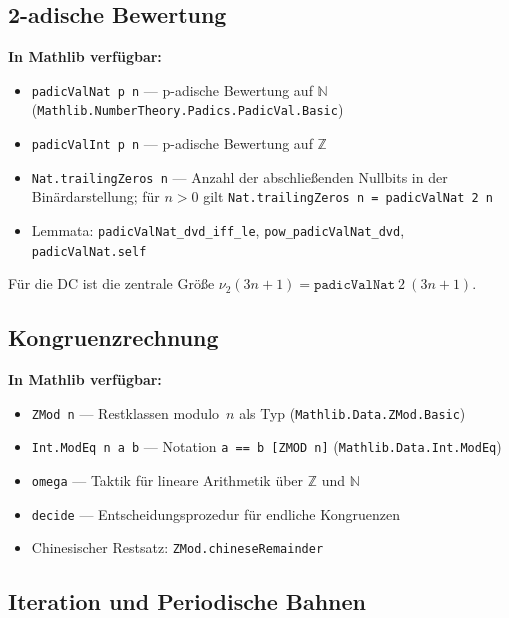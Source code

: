 \documentclass[12pt,a4paper]{article}
\newcommand{\vii}{\nu_2}
\newcommand{\N}{\mathbb{N}}
\newcommand{\Z}{\mathbb{Z}}
\begin{document}
\subsection{2-adische Bewertung}

\begin{tcolorbox}[ergebnis]
\textbf{In Mathlib verfügbar:}
\begin{itemize}
  \item \lstinline|padicValNat p n| --- p-adische Bewertung auf $\N$
    (\texttt{Mathlib.NumberTheory.Padics.PadicVal.Basic})
  \item \lstinline|padicValInt p n| --- p-adische Bewertung auf $\Z$
  \item \lstinline|Nat.trailingZeros n| --- Anzahl der abschließenden Nullbits
    in der Binärdarstellung; für $n > 0$ gilt
    \lstinline|Nat.trailingZeros n = padicValNat 2 n|
  \item Lemmata: \lstinline|padicValNat_dvd_iff_le|,
    \lstinline|pow_padicValNat_dvd|, \lstinline|padicValNat.self|
\end{itemize}
\end{tcolorbox}

Für die DC ist die zentrale Größe $\vii(3n+1) = \mathtt{padicValNat}\ 2\ (3n+1)$.

\subsection{Kongruenzrechnung}

\begin{tcolorbox}[ergebnis]
\textbf{In Mathlib verfügbar:}
\begin{itemize}
  \item \lstinline|ZMod n| --- Restklassen modulo~$n$ als Typ
    (\texttt{Mathlib.Data.ZMod.Basic})
  \item \lstinline|Int.ModEq n a b| --- Notation \lstinline|a == b [ZMOD n]|
    (\texttt{Mathlib.Data.Int.ModEq})
  \item \lstinline|omega| --- Taktik für lineare Arithmetik über $\Z$ und $\N$
  \item \lstinline|decide| --- Entscheidungsprozedur für endliche Kongruenzen
  \item Chinesischer Restsatz: \lstinline|ZMod.chineseRemainder|
\end{itemize}
\end{tcolorbox}

\subsection{Iteration und Periodische Bahnen}
\end{document}
